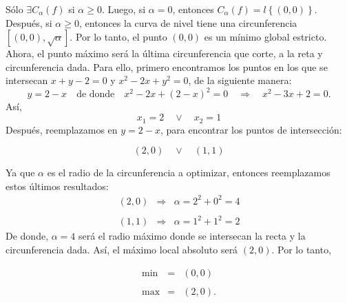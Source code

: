\begin{enumerate}
	Sólo $\exists C_\alpha(f)$ si $\alpha\geq 0$. Luego, si $\alpha=0$, entonces $C_{\alpha}(f)=l\left\{ (0,0) \right\}$. Después, si $\alpha\geq 0$, entonces la curva de nivel tiene una circunferencia $\left[(0,0),\sqrt{\alpha}\right]$. Por lo tanto, el punto $(0,0)$ es un mínimo global estricto.\\
	Ahora, el punto máximo será la última circunferencia que corte, a la reta y circunferencia dada. Para ello, primero encontramos los puntos en los que se intersecan $x+y-2=0$ y $x^2-2x+y^2=0$, de la siguiente manera:
	$$y=2-x \quad\mbox{de donde}\quad x^2-2x+(2-x)^2=0\quad \Rightarrow \quad x^2-3x+2=0.$$
	Así,
	    $$x_1=2\quad \lor \quad x_2=1$$
	Después, reemplazamos en $y=2-x$, para encontrar los puntos de intersección:
	\begin{tcolorbox}
	    $$(2,0)\quad \lor \quad (1,1)$$
	\end{tcolorbox}

	Ya que $\alpha$ es el radio de la circunferencia a optimizar, entonces reemplazamos estos últimos resultados:
	$$
	\begin{array}{rcl}
	    (2,0) & \Rightarrow & \alpha=2^2+0^2=4\\\\
	    (1,1) & \Rightarrow & \alpha=1^2+1^2=2
	\end{array}
	$$
	De donde, $\alpha=4$ será el radio máximo donde se intersecan la recta y la circunferencia dada. Así, el máximo local absoluto será $(2,0)$. Por lo tanto, 
	\begin{tcolorbox}
	    $$
	    \begin{array}{rcl}
		\min &=& (0,0)\\\\
		\max &=& (2,0).
	    \end{array}
	    $$
	\end{tcolorbox}

\end{enumerate}



